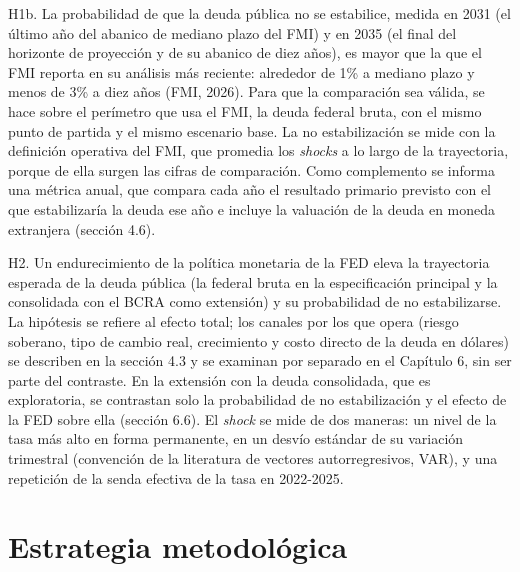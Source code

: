 H1b. La probabilidad de que la deuda pública no se estabilice, medida en
2031 (el último año del abanico de mediano plazo del FMI) y en 2035 (el
final del horizonte de proyección y de su abanico de diez años), es
mayor que la que el FMI reporta en su análisis más reciente: alrededor
de 1\% a mediano plazo y menos de 3\% a diez años (FMI, 2026). Para que
la comparación sea válida, se hace sobre el perímetro que usa el FMI, la
deuda federal bruta, con el mismo punto de partida y el mismo escenario
base. La no estabilización se mide con la definición operativa del FMI,
que promedia los \emph{shocks} a lo largo de la trayectoria, porque de
ella surgen las cifras de comparación. Como complemento se informa una
métrica anual, que compara cada año el resultado primario previsto con
el que estabilizaría la deuda ese año e incluye la valuación de la deuda
en moneda extranjera (sección 4.6).

H2. Un endurecimiento de la política monetaria de la FED eleva la
trayectoria esperada de la deuda pública (la federal bruta en la
especificación principal y la consolidada con el BCRA como extensión) y
su probabilidad de no estabilizarse. La hipótesis se refiere al efecto
total; los canales por los que opera (riesgo soberano, tipo de cambio
real, crecimiento y costo directo de la deuda en dólares) se describen
en la sección 4.3 y se examinan por separado en el Capítulo 6, sin ser
parte del contraste. En la extensión con la deuda consolidada, que es
exploratoria, se contrastan solo la probabilidad de no estabilización y
el efecto de la FED sobre ella (sección 6.6). El \emph{shock} se mide de
dos maneras: un nivel de la tasa más alto en forma permanente, en un
desvío estándar de su variación trimestral (convención de la literatura
de vectores autorregresivos, VAR), y una repetición de la senda efectiva
de la tasa en 2022-2025.

\section{Estrategia metodológica}

